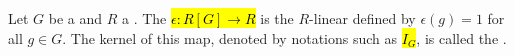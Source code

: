 \begin{definition} \label{definition:augmentation_map_of_a_group_ring_to_its_base_ring}
Let $G$ be a  and $R$ a .
The  \hl{$\epsilon: R[G] \to R$} is the $R$-linear  defined by $\epsilon(g) = 1$ for all $g \in G$. The kernel of this map, denoted by notations such as \hl{$I_G$}, is called the .
\end{definition}